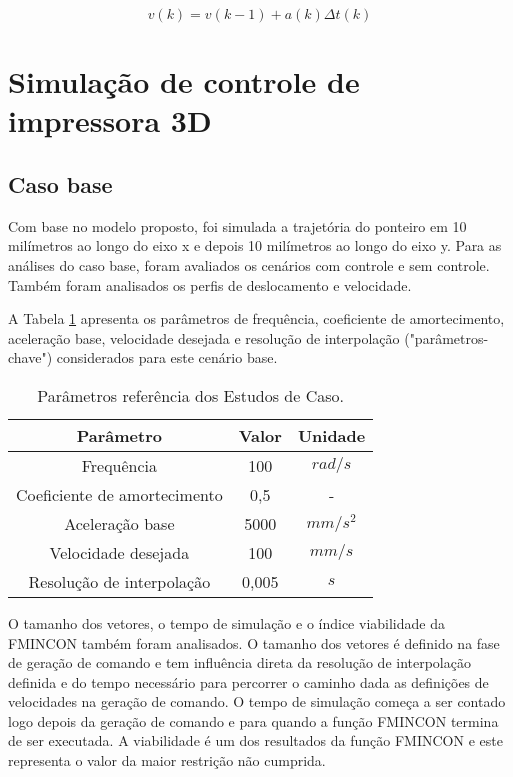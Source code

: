 \begin{equation}
    \label{eq:der_b}      
        v(k) = v(k-1)+a(k) \Delta t(k)
\end{equation}

\section{Simulação de controle de impressora 3D}

\subsection{Caso base} 

Com base no modelo proposto, foi simulada a trajetória do ponteiro em 10 milímetros ao longo do eixo x e depois 10 milímetros ao longo do eixo y. Para as análises do caso base, foram avaliados os cenários com controle e sem controle. Também foram analisados os perfis de deslocamento e velocidade. 

A Tabela \ref{tab:base_params} apresenta os parâmetros de frequência, coeficiente de amortecimento, aceleração base, velocidade desejada e resolução de interpolação ("parâmetros-chave") considerados para este cenário base.

\begin{table}
    \begin{center}
    \caption{Parâmetros referência dos Estudos de Caso.}
    \label{tab:base_params}
    \begin{tabular}{c c c}
        Parâmetro & Valor & Unidade\\ \hline
        Frequência & 100 & $rad/s$\\
        Coeficiente de amortecimento & 0,5 & - \\
        Aceleração base & 5000 & $mm/s^2$ \\
        Velocidade desejada & 100 & $mm/s$ \\
        Resolução de interpolação & 0,005 & $s$ \\ \hline
    \end{tabular}
    \end{center}
\end{table}

O tamanho dos vetores, o tempo de simulação e o índice viabilidade da FMINCON também foram analisados. O tamanho dos vetores é definido na fase de geração de comando e tem influência direta da resolução de interpolação definida e
do tempo necessário para percorrer o caminho dada as definições de velocidades na geração de comando.
O tempo de simulação começa a ser contado logo depois da geração de comando e para quando a função FMINCON
termina de ser executada.
A viabilidade é um dos resultados da função FMINCON e este representa o valor da maior restrição não cumprida.

